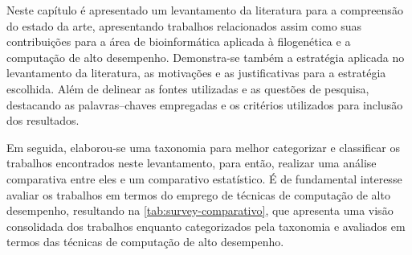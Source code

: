 \documentclass[english,brazilian]{UNISINOSmonografia} %
\begin{document}





Neste capítulo é apresentado um levantamento da literatura para a compreensão do estado da arte, apresentando trabalhos relacionados assim como suas contribuições para a área de bioinformática aplicada à filogenética e a computação de alto desempenho.
%
Demonstra-se também a estratégia aplicada no levantamento da literatura, as motivações e as justificativas para a estratégia escolhida. Além de delinear as fontes utilizadas e as questões de pesquisa, destacando as palavras--chaves empregadas e os critérios utilizados para inclusão dos resultados.


Em seguida, elaborou-se uma taxonomia para melhor categorizar e classificar os trabalhos encontrados neste levantamento, para então, realizar uma análise comparativa entre eles e um comparativo estatístico. É de fundamental interesse avaliar os trabalhos em termos do emprego de técnicas de computação de alto desempenho, resultando na \autoref{tab:survey-comparativo}, que apresenta uma visão consolidada dos trabalhos enquanto categorizados pela taxonomia e avaliados em termos das técnicas de computação de alto desempenho.
\end{document}
